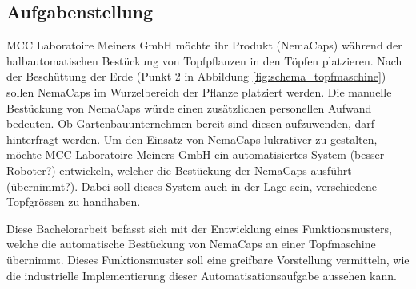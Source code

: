 \subsection{Aufgabenstellung}
MCC Laboratoire Meiners GmbH möchte ihr Produkt (NemaCaps) während der halbautomatischen Bestückung von Topfpflanzen in den Töpfen platzieren. Nach der Beschüttung der Erde (Punkt 2 in Abbildung \ref{fig:schema_topfmaschine}) sollen NemaCaps im Wurzelbereich der Pflanze platziert werden. Die manuelle Bestückung von NemaCaps würde einen zusätzlichen personellen Aufwand bedeuten. Ob Gartenbauunternehmen bereit sind diesen aufzuwenden, darf hinterfragt werden. Um den Einsatz von NemaCaps lukrativer zu gestalten, möchte MCC Laboratoire Meiners GmbH ein automatisiertes System (besser Roboter?) entwickeln, welcher die Bestückung der NemaCaps ausführt (übernimmt?). Dabei soll dieses System auch in der Lage sein, verschiedene Topfgrössen zu handhaben.
\newline

Diese Bachelorarbeit befasst sich mit der Entwicklung eines Funktionsmusters, welche die automatische Bestückung von NemaCaps an einer Topfmaschine übernimmt. Dieses Funktionsmuster soll eine greifbare Vorstellung vermitteln, wie die industrielle Implementierung dieser Automatisationsaufgabe aussehen kann. 
\newline 

